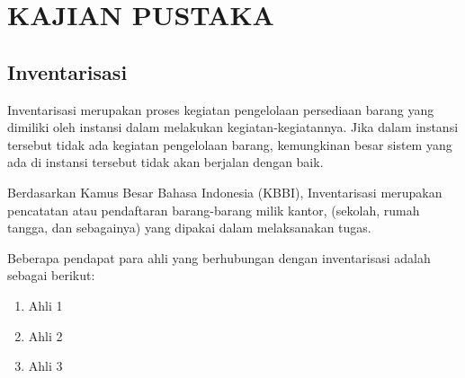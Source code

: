 
\chapter{KAJIAN PUSTAKA} 

\section{Inventarisasi}

Inventarisasi merupakan proses kegiatan pengelolaan persediaan barang yang dimiliki oleh instansi dalam melakukan kegiatan-kegiatannya. Jika dalam instansi tersebut tidak ada kegiatan pengelolaan barang, kemungkinan besar sistem yang ada di instansi tersebut tidak akan berjalan dengan baik.

Berdasarkan Kamus Besar Bahasa Indonesia (KBBI), Inventarisasi merupakan pencatatan atau pendaftaran barang-barang milik kantor, (sekolah, rumah tangga, dan sebagainya) yang dipakai dalam melaksanakan tugas.

Beberapa pendapat para ahli yang berhubungan dengan inventarisasi adalah sebagai berikut:
\begin{enumerate}
	\item Ahli 1
	\item Ahli 2
	\item Ahli 3
\end{enumerate}


